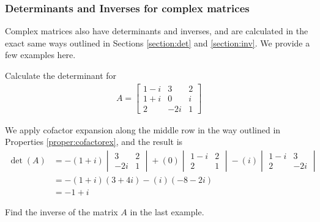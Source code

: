 \subsubsection{Determinants and Inverses for complex matrices}
Complex matrices also have determinants and inverses, and are calculated in the exact same ways outlined in Sections \ref{section:det} and \ref{section:inv}. We provide a few examples here.

\begin{exmp}
Calculate the determinant for
\begin{align*}
A = 
\begin{bmatrix}
1-i & 3 & 2 \\
1+i & 0 & i \\
2 & -2i & 1
\end{bmatrix}
\end{align*}
\end{exmp}
\begin{solution}
We apply cofactor expansion along the middle row in the way outlined in Properties \ref{proper:cofactorex}, and the result is
\begin{align*}
\det(A) &= -(1+i)
\begin{vmatrix}
3 & 2 \\
-2i & 1
\end{vmatrix}
+ (0)
\begin{vmatrix}
1-i & 2 \\
2 & 1
\end{vmatrix}
- (i)
\begin{vmatrix}
1-i & 3 \\
2 & -2i
\end{vmatrix} \\
&= -(1+i)(3+4i) - (i)(-8-2i) \\
&= -1 + i
\end{align*}  
\end{solution}

\begin{exmp}
Find the inverse of the matrix $A$ in the last example.
\end{exmp}

